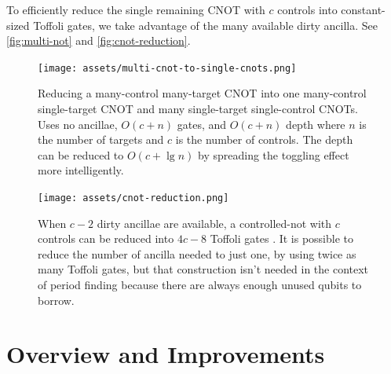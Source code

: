 \documentclass[twocolumn,longbibliography]{quantumarticle-customized}
\begin{document}
To efficiently reduce the single remaining CNOT with $c$ controls into constant-sized Toffoli gates, we take advantage of the many available dirty ancilla.
See \autoref{fig:multi-not} and \autoref{fig:cnot-reduction}.

\begin{figure}
  \centering
  \texttt{[image: assets/multi-cnot-to-single-cnots.png]}
  \caption{
    Reducing a many-control many-target CNOT into one many-control single-target CNOT and many single-target single-control CNOTs.
    Uses no ancillae, $O(c + n)$ gates, and $O(c + n)$ depth where $n$ is the number of targets and $c$ is the number of controls.
    The depth can be reduced to $O(c + \lg n)$ by spreading the toggling effect more intelligently.
  }
  \label{fig:multi-not}
\end{figure}

\begin{figure}
  \centering
  \texttt{[image: assets/cnot-reduction.png]}
  \caption{
    When $c-2$ dirty ancillae are available, a controlled-not with $c$ controls can be reduced into $4c - 8$ Toffoli gates \cite{barenco1995}.
    It is possible to reduce the number of ancilla needed to just one, by using twice as many Toffoli gates, but that construction isn't needed in the context of period finding because there are always enough unused qubits to borrow.
  }
  \label{fig:cnot-reduction}
\end{figure}

\section{Overview and Improvements} \label{sec:costs}
\end{document}
